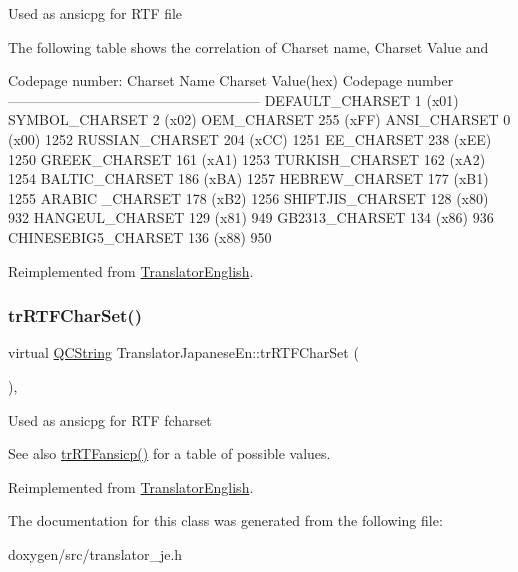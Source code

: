 Used as ansicpg for R\+TF file

The following table shows the correlation of Charset name, Charset Value and 
\begin{DoxyPre}
Codepage number:
Charset Name       Charset Value(hex)  Codepage number
------------------------------------------------------
DEFAULT\_CHARSET           1 (x01)
SYMBOL\_CHARSET            2 (x02)
OEM\_CHARSET             255 (xFF)
ANSI\_CHARSET              0 (x00)            1252
RUSSIAN\_CHARSET         204 (xCC)            1251
EE\_CHARSET              238 (xEE)            1250
GREEK\_CHARSET           161 (xA1)            1253
TURKISH\_CHARSET         162 (xA2)            1254
BALTIC\_CHARSET          186 (xBA)            1257
HEBREW\_CHARSET          177 (xB1)            1255
ARABIC \_CHARSET         178 (xB2)            1256
SHIFTJIS\_CHARSET        128 (x80)             932
HANGEUL\_CHARSET         129 (x81)             949
GB2313\_CHARSET          134 (x86)             936
CHINESEBIG5\_CHARSET     136 (x88)             950
\end{DoxyPre}
 

Reimplemented from \mbox{\hyperlink{class_translator_english_a58d43df9c7e82cf874f2d0ac64547a3a}{Translator\+English}}.

\mbox{\label{class_translator_japanese_en_aff3e71dc3a1d71f056fea3299c8a427e}} 
\subsubsection{\texorpdfstring{trRTFCharSet()}{trRTFCharSet()}}
{\footnotesize\ttfamily virtual \mbox{\hyperlink{class_q_c_string}{Q\+C\+String}} Translator\+Japanese\+En\+::tr\+R\+T\+F\+Char\+Set (\begin{DoxyParamCaption}{ }\end{DoxyParamCaption})\hspace{0.3cm}{\ttfamily [inline]}, {\ttfamily [virtual]}}

Used as ansicpg for R\+TF fcharset \begin{DoxySeeAlso}{See also}
\mbox{\hyperlink{class_translator_japanese_en_a4da6df8b58582eb97ffef9f75e070c0f}{tr\+R\+T\+Fansicp()}} for a table of possible values. 
\end{DoxySeeAlso}


Reimplemented from \mbox{\hyperlink{class_translator_english_a5c66e7339c73f03d5cae6291c21b98b8}{Translator\+English}}.



The documentation for this class was generated from the following file\+:\begin{DoxyCompactItemize}
\item 
doxygen/src/translator\+\_\+je.\+h\end{DoxyCompactItemize}

